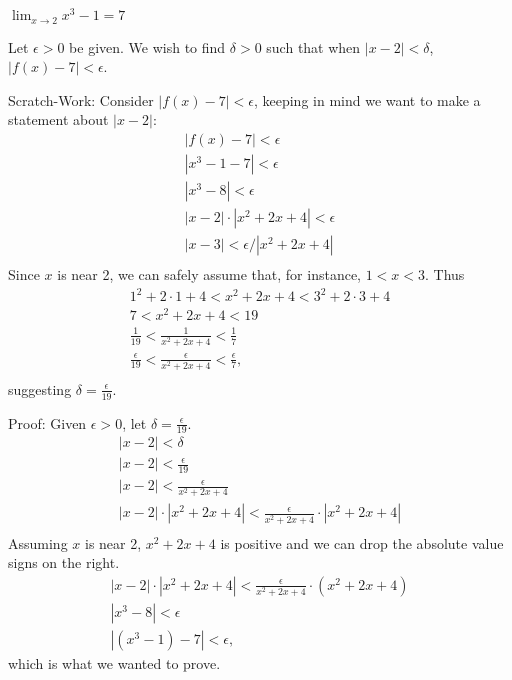 {$\displaystyle \lim_{x\to 2} x^3-1 = 7$}
{Let $\epsilon >0$ be given. We wish to find $\delta >0$ such that when $|x-2|<\delta$, $|f(x)-7|<\epsilon$. 

Scratch-Work:
Consider $|f(x)-7|<\epsilon$, keeping in  mind we want to make a statement about $|x-2|$:
\begin{gather*}
|f(x) -7 | < \epsilon \\
|x^3-1 -7 |<\epsilon \\
| x^3-8 | < \epsilon \\
| x-2 |\cdot|x^2+2x+4| < \epsilon \\
| x-3 | < \epsilon/|x^2+2x+4| \\
\end{gather*}
Since $x$ is near 2, we can safely assume that, for instance, $1<x<3$. Thus
\begin{gather*}
1^2+2\cdot1+4<x^2+2x+4<3^2+2\cdot3+4 \\
7 < x^2+2x+4 < 19 \\
\frac{1}{19} < \frac{1}{x^2+2x+4} < \frac{1}{7} \\
\frac{\epsilon}{19} < \frac{\epsilon}{x^2+2x+4} < \frac{\epsilon}{7}, \\
\end{gather*}
suggesting $\delta =\frac{\epsilon}{19}$.

Proof: Given $\epsilon>0$, let $\delta =\frac{\epsilon}{19}$.
\begin{gather*}
|x-2|<\delta \\
|x-2| < \frac{\epsilon}{19}\\
|x-2| < \frac{\epsilon}{x^2+2x+4}\\
|x-2|\cdot|x^2+2x+4| < \frac{\epsilon}{x^2+2x+4}\cdot|x^2+2x+4|\\
\end{gather*}
Assuming $x$ is near 2, $x^2+2x+4$ is positive and we can drop the absolute value signs on the right.
\begin{gather*}
|x-2|\cdot|x^2+2x+4| < \frac{\epsilon}{x^2+2x+4}\cdot(x^2+2x+4)\\
|x^3-8| < \epsilon\\
|(x^3-1) - 7| < \epsilon,
\end{gather*}
which is what we wanted to prove.
}



